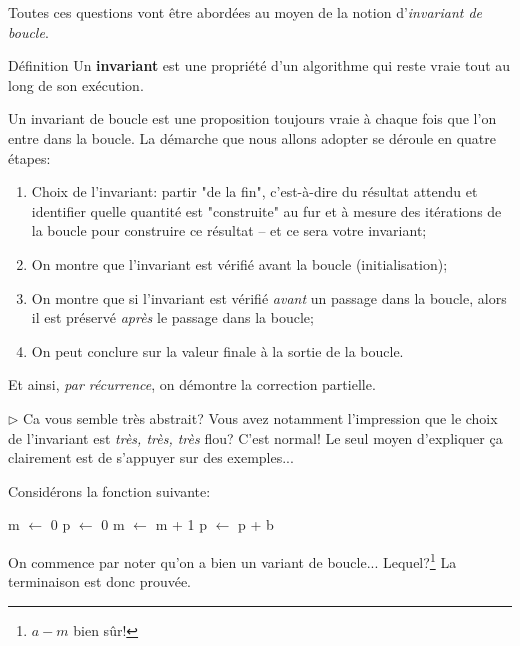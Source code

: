\documentclass[12pt]{article}
\begin{document}
	Toutes ces questions vont être abordées au moyen de la notion d'\textit{invariant de boucle}.
	
	\begin{MonAmp}{Définition}
		Un \textbf{invariant} est une propriété d'un algorithme qui reste vraie tout au long de son exécution.
	\end{MonAmp}
	
	Un invariant de boucle est une proposition toujours vraie à chaque fois que l'on entre dans la boucle. La démarche que nous allons adopter se déroule en quatre étapes:
	\begin{enumerate}
		\item Choix de l'invariant: partir "de la fin", c'est-à-dire du résultat attendu et identifier quelle quantité est "construite" au fur et à mesure des itérations de la boucle pour construire ce résultat -- et ce sera votre invariant;
		\item On montre que l’invariant est vérifié avant la boucle (initialisation);
		\item On montre que si l'invariant est vérifié \textit{avant }un passage dans la boucle, alors il est préservé \textit{après }le passage dans la boucle;
		\item On peut conclure sur la valeur finale à la sortie de la boucle.
	\end{enumerate}
	
	Et ainsi, \textit{par récurrence}, on démontre la correction partielle.
	
	$\rhd$ Ca vous semble très abstrait? Vous avez notamment l'impression que le choix de l'invariant est \textit{très, très, très} flou? C'est normal! Le seul moyen d'expliquer ça clairement est de s'appuyer sur des exemples...
	
	Considérons la fonction suivante:
	\begin{algorithmic}[1]
		\State m $\leftarrow$ 0
		\State p $\leftarrow$ 0
		\State m $\leftarrow$ m + 1
		\State p $\leftarrow$ p + b
		\EndWhile
		\State{}
		\EndFunction
	\end{algorithmic}
	
	On commence par noter qu'on a bien un variant de boucle... Lequel?\footnote{$a - m$ bien sûr!} La terminaison est donc prouvée.
	
\end{document}
